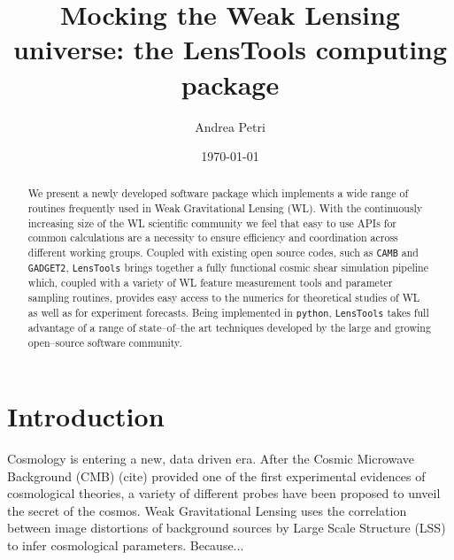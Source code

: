 \documentclass[reprint,aps,prd,superscriptaddress,showkeys,showpacs]{revtex4-1}
\newcommand{\ttt}[1]{\texttt{#1}}
\begin{document}
\title{Mocking the Weak Lensing universe: the LensTools computing package}

\author{Andrea Petri}

\date{\today}

\label{firstpage}

\begin{abstract}
We present a newly developed software package which implements a wide range of routines frequently used in Weak Gravitational Lensing (WL). With the continuously increasing size of the WL scientific community we feel that easy to use APIs for common calculations are a necessity to ensure efficiency and coordination across different working groups. Coupled with existing open source codes, such as \ttt{CAMB}\citep{CAMB} and \ttt{GADGET2}\citep{Gadget2}, \ttt{LensTools} brings together a fully functional cosmic shear simulation pipeline which, coupled with a variety of WL feature measurement tools and parameter sampling routines, provides easy access to the numerics for theoretical studies of WL as well as for experiment forecasts. Being implemented in \ttt{python}\citep{python}, \ttt{LensTools} takes full advantage of a range of state--of--the art techniques developed by the large and growing open--source software community.    
    
\end{abstract}



\maketitle



\section{Introduction}
%
Cosmology is entering a new, data driven era. After the Cosmic Microwave Background (CMB) (cite) provided one of the first experimental evidences of cosmological theories, a variety of different probes have been proposed to unveil the secret of the cosmos. Weak Gravitational Lensing uses the correlation between image distortions of background sources by Large Scale Structure (LSS) to infer cosmological parameters. Because... 
\end{document}

